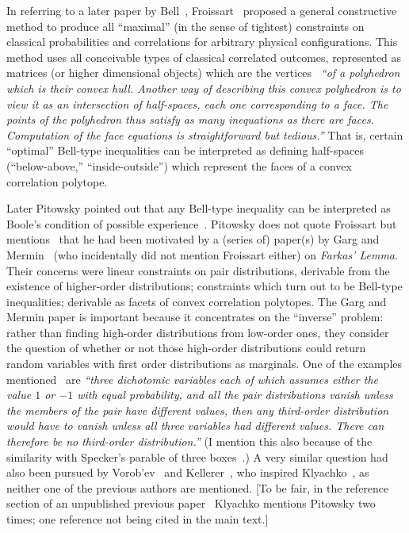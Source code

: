 \documentclass[%
  twocolumn,
 showpacs,
 showkeys,
 preprintnumbers,
 amsmath,amssymb,
 aps,
  pra,
  longbibliography,
 floatfix,
 ]{revtex4-1}
\begin{document}
In referring to a later paper by Bell~\cite{Bell-71}, Froissart~\cite{froissart-81,cirelson}
proposed a general constructive method to produce all ``maximal'' (in the sense of tightest)
constraints on classical probabilities and correlations for arbitrary physical configurations.
This method uses all conceivable types of classical correlated outcomes, represented as matrices (or higher dimensional objects)
which are the vertices~\cite[p.~243]{froissart-81}  {\em ``of a polyhedron which is their convex hull.
Another way of describing this convex polyhedron is to view it as an intersection
of half-spaces, each one corresponding to a face. The points of the
polyhedron thus satisfy as many inequations as there are faces. Computation
of the face equations is straightforward but tedious.''}
That is, certain ``optimal'' Bell-type inequalities can be interpreted as
defining half-spaces (``below-above,'' ``inside-outside'')
which represent the faces of a convex correlation polytope.

Later Pitowsky pointed out that any Bell-type inequality can be interpreted as
Boole's condition of possible experience~\cite{pitowsky-86,pitowsky,pitowsky-89a,Pit-91,Pit-94,2000-poly}.
Pitowsky  does not quote Froissart but mentions~\cite[p.~1556]{pitowsky-86} that he
had been motivated by a (series of) paper(s) by Garg and Mermin~\cite{Garg1984}
(who incidentally did not mention Froissart either)
on  {\em Farkas' Lemma}.
Their concerns were linear constraints on pair distributions, derivable from the existence of higher-order distributions;
constraints which turn out to be Bell-type inequalities; derivable as facets of convex correlation polytopes.
The Garg and Mermin paper is important because it concentrates on the ``inverse'' problem:
rather than finding high-order distributions
from low-order ones,  they consider the
question of whether or not those high-order distributions could return random variables with first order distributions as
marginals. One of the examples mentioned~\cite[p.~2]{Garg1984}
are {\em ``three dichotomic
variables each of which assumes either the value $1$ or $-1$ with equal
probability, and all the pair distributions vanish unless the members of the
pair have different values, then any third-order distribution would have to
vanish unless all three variables had different values. There can therefore be
no third-order distribution.''}
(I mention this also because of the similarity with Specker's parable of three boxes~\cite{specker-60,svozil-2016-s}.)
A very similar question had also been pursued by Vorob'ev~\cite{Vorobev-1962} and Kellerer~\cite{Kellerer-1964,Kellerer-1984},
who inspired Klyachko~\cite{Klyachko-2008},
as neither one of the previous authors are mentioned.
[To be fair, in the reference section of an unpublished previous paper~\cite{Klyachko-2002} Klyachko
mentions Pitowsky two times; one reference not being cited in the main text.]
\end{document}
